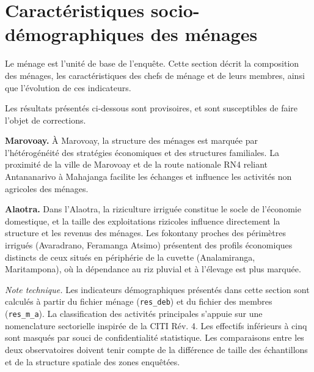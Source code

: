 \documentclass[
  french,
  letterpaper,
]{report}
\begin{document}

\chapter{Caractéristiques socio-démographiques des
ménages}\label{caractuxe9ristiques-socio-duxe9mographiques-des-muxe9nages}

Le ménage est l'unité de base de l'enquête. Cette section décrit la
composition des ménages, les caractéristiques des chefs de ménage et de
leurs membres, ainsi que l'évolution de ces indicateurs.

\begin{tcolorbox}[enhanced jigsaw, colframe=quarto-callout-warning-color-frame, colback=white, titlerule=0mm, colbacktitle=quarto-callout-warning-color!10!white, toptitle=1mm, opacitybacktitle=0.6, title=\textcolor{quarto-callout-warning-color}{\faExclamationTriangle}\hspace{0.5em}{Travail de vérification en cours}, left=2mm, leftrule=.75mm, bottomtitle=1mm, coltitle=black, arc=.35mm, rightrule=.15mm, bottomrule=.15mm, toprule=.15mm, opacityback=0, breakable]

Les résultats présentés ci-dessous sont provisoires, et sont
susceptibles de faire l'objet de corrections.

\end{tcolorbox}

\textbf{Marovoay.} À Marovoay, la structure des ménages est marquée par
l'hétérogénéité des stratégies économiques et des structures familiales.
La proximité de la ville de Marovoay et de la route nationale RN4
reliant Antananarivo à Mahajanga facilite les échanges et influence les
activités non agricoles des ménages.

\textbf{Alaotra.} Dans l'Alaotra, la riziculture irriguée constitue le
socle de l'économie domestique, et la taille des exploitations rizicoles
influence directement la structure et les revenus des ménages. Les
fokontany proches des périmètres irrigués (Avaradrano, Feramanga Atsimo)
présentent des profils économiques distincts de ceux situés en
périphérie de la cuvette (Analamiranga, Maritampona), où la dépendance
au riz pluvial et à l'élevage est plus marquée.

\emph{Note technique.} Les indicateurs démographiques présentés dans
cette section sont calculés à partir du fichier ménage
(\texttt{res\_deb}) et du fichier des membres (\texttt{res\_m\_a}). La
classification des activités principales s'appuie sur une nomenclature
sectorielle inspirée de la CITI Rév. 4. Les effectifs inférieurs à cinq
sont masqués par souci de confidentialité statistique. Les comparaisons
entre les deux observatoires doivent tenir compte de la différence de
taille des échantillons et de la structure spatiale des zones enquêtées.
\end{document}
